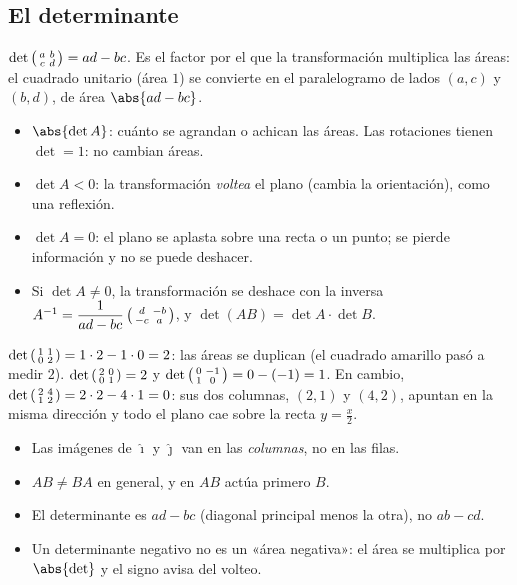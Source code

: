 \documentclass[11pt,a4paper]{article}
\newcommand{\ii}{\hat{\imath}}
\newcommand{\jj}{\hat{\jmath}}
\newcommand{\matdos}[4]{\mathchoice{\begin{pmatrix}#1 & #2\\ #3 & #4\end{pmatrix}}{\left(\begin{smallmatrix}#1 & #2\\ #3 & #4\end{smallmatrix}\right)}{\left(\begin{smallmatrix}#1 & #2\\ #3 & #4\end{smallmatrix}\right)}{\left(\begin{smallmatrix}#1 & #2\\ #3 & #4\end{smallmatrix}\right)}}
\begin{document}
\subsection{El determinante}
\begin{definicion}[Determinante]
$\det\matdos abcd=ad-bc$. Es el factor por el que la transformación multiplica las áreas: el cuadrado unitario
(área $1$) se convierte en el paralelogramo de lados $(a,c)$ y $(b,d)$, de área $\abs{ad-bc}$.
\end{definicion}
\begin{propiedad}
\begin{itemize}
\item $\abs{\det A}$: cuánto se agrandan o achican las áreas. Las rotaciones tienen $\det=1$: no cambian áreas.
\item $\det A<0$: la transformación \emph{voltea} el plano (cambia la orientación), como una reflexión.
\item $\det A=0$: el plano se aplasta sobre una recta o un punto; se pierde información y no se puede deshacer.
\item Si $\det A\neq0$, la transformación se deshace con la inversa
      $A^{-1}=\dfrac{1}{ad-bc}\matdos d{-b}{-c}a$, y $\det(AB)=\det A\cdot\det B$.
\end{itemize}
\end{propiedad}
\begin{ejemplo}
$\det\matdos1102=1\cdot2-1\cdot0=2$: las áreas se duplican (el cuadrado amarillo pasó a medir $2$).
$\det\matdos2001=2$ y $\det\matdos0{-1}10=0-(-1)=1$. En cambio, $\det\matdos2412=2\cdot2-4\cdot1=0$: sus dos
columnas, $(2,1)$ y $(4,2)$, apuntan en la misma dirección y todo el plano cae sobre la recta $y=\tfrac{x}{2}$.
\end{ejemplo}
\begin{ojo}
\begin{itemize}
\item Las imágenes de $\ii$ y $\jj$ van en las \emph{columnas}, no en las filas.
\item $AB\neq BA$ en general, y en $AB$ actúa primero $B$.
\item El determinante es $ad-bc$ (diagonal principal menos la otra), no $ab-cd$.
\item Un determinante negativo no es un «área negativa»: el área se multiplica por $\abs{\det}$ y el signo avisa del volteo.
\end{itemize}
\end{ojo}
\end{document}
